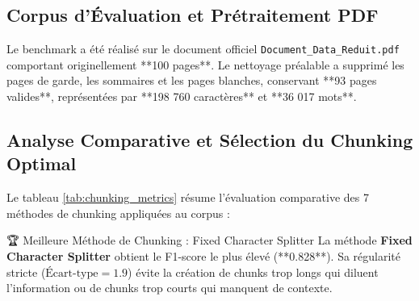 \documentclass[12pt,a4paper,oneside]{report}
\begin{document}
\subsection{Corpus d'Évaluation et Prétraitement PDF}
Le benchmark a été réalisé sur le document officiel \texttt{Document\_Data\_Reduit.pdf} comportant originellement **100 pages**. Le nettoyage préalable a supprimé les pages de garde, les sommaires et les pages blanches, conservant **93 pages valides**, représentées par **198 760 caractères** et **36 017 mots**.

\subsection{Analyse Comparative et Sélection du Chunking Optimal}
Le tableau \ref{tab:chunking_metrics} résume l'évaluation comparative des 7 méthodes de chunking appliquées au corpus :

\begin{table}[H]
\centering
\small
\caption{Benchmark des 7 méthodes de Chunking (Données Identiques Plateforme)}
\label{tab:chunking_metrics}
\end{table}

\begin{bestbox}{🏆 Meilleure Méthode de Chunking : Fixed Character Splitter}
La méthode \textbf{Fixed Character Splitter} obtient le F1-score le plus élevé (**0.828**). Sa régularité stricte ($\text{Écart-type} = 1.9$) évite la création de chunks trop longs qui diluent l'information ou de chunks trop courts qui manquent de contexte.
\end{bestbox}
\end{document}
